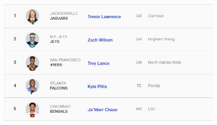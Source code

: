 \documentclass[oneside,12pt]{Classes/RoboticsLaTeX}
\begin{document}
\begin{figure}[hb]
  \centering
  \begin{minipage}{1\textwidth}
    \centering
    \includegraphics[width=1\linewidth]{Figures/NFLcom_example.png}
    \label{fig:NFL_draft}
  \end{minipage}%
\end{figure}
\end{document}
